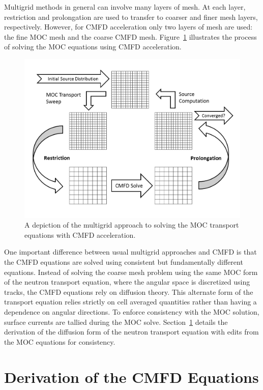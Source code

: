 Multigrid methods in general can involve many layers of mesh. At each layer, restriction and prolongation are used to transfer to coarser and finer mesh layers, respectively. However, for CMFD acceleration only two layers of mesh are used: the fine MOC mesh and the coarse CMFD mesh. Figure~\ref{fig:multigrid-cmfd} illustrates the process of solving the MOC equations using CMFD acceleration.
\begin{figure}[h!] 
	\centering 
	\includegraphics[width=\linewidth]{figures/multigrid-cmfd.PNG}
	\caption[]{A depiction of the multigrid approach to solving the MOC transport equations with CMFD acceleration.}
	\label{fig:multigrid-cmfd}
\end{figure}

One important difference between usual multigrid approaches and CMFD is that the CMFD equations are solved using consistent but fundamentally different equations. Instead of solving the coarse mesh problem using the same MOC form of the neutron transport equation, where the angular space is discretized using tracks, the CMFD equations rely on diffusion theory. This alternate form of the transport equation relies strictly on cell averaged quantities rather than having a dependence on angular directions. To enforce consistency with the MOC solution, surface currents are tallied during the MOC solve. Section~\ref{sec:cmfd-derivation} details the derivation of the diffusion form of the neutron transport equation with edits from the MOC equations for consistency.

\section{Derivation of the CMFD Equations}
\label{sec:cmfd-derivation}

